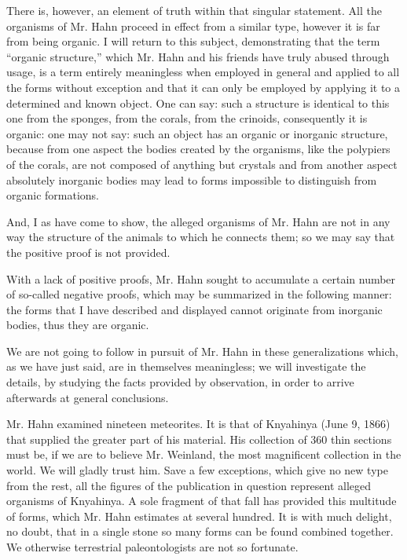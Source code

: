 \documentclass[a4paper, 12pt, oneside]{article}
\begin{document}
There is, however, an element of truth within that singular statement. All the organisms of Mr. Hahn proceed in effect from a similar type, however it is far from being organic. I will return to this subject, demonstrating that the term ``organic structure,'' which Mr. Hahn and his friends have truly abused through usage, is a term entirely meaningless when employed in general and applied to all the forms without exception and that it can only be employed by applying it to a determined and known object. One can say: such a structure is identical to this one from the sponges, from the corals, from the crinoids, consequently it is organic: one may not say: such an object has an organic or inorganic structure, because from one aspect the bodies created by the organisms, like the polypiers of the corals, are not composed of anything but crystals and from another aspect absolutely inorganic bodies may lead to forms impossible to distinguish from organic formations.

And, I as have come to show, the alleged organisms of Mr. Hahn are not in any way the structure of the animals to which he connects them; so we may say that the positive proof is not provided.

With a lack of positive proofs, Mr. Hahn sought to accumulate a certain number of so-called negative proofs, which may be summarized in the following manner: the forms that I have described and displayed cannot originate from inorganic bodies, thus they are organic.

We are not going to follow in pursuit of Mr. Hahn in these generalizations which, as we have just said, are in themselves meaningless; we will investigate the details, by studying the facts provided by observation, in order to arrive afterwards at general conclusions.

Mr. Hahn examined nineteen meteorites. It is that of Knyahinya (June 9, 1866) that supplied the greater part of his material. His collection of 360 thin sections must be, if we are to believe Mr. Weinland, the most magnificent collection in the world. We will gladly trust him. Save a few exceptions, which give no new type from the rest, all the figures of the publication in question represent alleged organisms of Knyahinya. A sole fragment of that fall has provided this multitude of forms, which Mr. Hahn estimates at several hundred. It is with much delight, no doubt, that in a single stone so many forms can be found combined together. We otherwise terrestrial paleontologists are not so fortunate.
\end{document}
